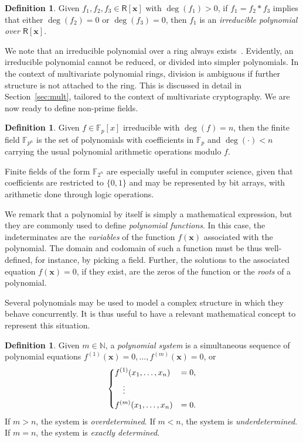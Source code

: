\documentclass[12pt, a4paper, oneside]{memoir}
\theoremstyle{definition}
\newtheorem{definition}[theorem]{Definition}
\begin{document}
\begin{definition}
  Given $f_{1}, f_{2}, f_{3} \in \mathsf{R}[\mathbf{x}]$ with $\deg(f_{1}) > 0$, if $f_{1} = f_{2} \ast f_{3}$ implies that either $\deg(f_{2}) = 0$ or $\deg(f_{3}) = 0$, then $f_{1}$ is an \emph{irreducible polynomial over $\mathsf{R}[\mathbf{x}]$}.
\end{definition}

We note that an irreducible polynomial over a ring always exists~\cite[Remark 2.1.25]{Mullen:2013}. Evidently, an irreducible polynomial cannot be reduced, or divided into simpler polynomials. In the context of multivariate polynomial rings, division is ambiguous if further structure is not attached to the ring. This is discussed in detail in Section~\ref{sec:mult}, tailored to the context of multivariate cryptography. We are now ready to define non-prime fields.

\begin{definition}
  Given $f \in \mathbb{F}_{p}[x]$ irreducible with $\deg(f) = n$, then the finite field $\mathbb{F}_{p^{n}}$ is the set of polynomials with coefficients in $\mathbb{F}_{p}$ and $\deg(\cdot) < n$ carrying the usual polynomial arithmetic operations modulo $f$.
\end{definition}

Finite fields of the form $\mathbb{F}_{2^{n}}$ are especially useful in computer science, given that coefficients are restricted to $\{0, 1\}$ and may be represented by bit arrays, with arithmetic done through logic operations.

We remark that a polynomial by itself is simply a mathematical expression, but they are commonly used to define \emph{polynomial functions}. In this case, the indeterminates are the \emph{variables} of the function $f(\mathbf{x})$ associated with the polynomial. The domain and codomain of such a function must be thus well-defined, for instance, by picking a field. Further, the solutions to the associated equation $f(\mathbf{x}) = 0$, if they exist, are the zeros of the function or the \emph{roots} of a polynomial. 

Several polynomials may be used to model a complex structure in which they behave concurrently. It is thus useful to have a relevant mathematical concept to represent this situation.

\begin{definition}\label{def:polsys}
  Given $m \in \mathbb{N}$, a \emph{polynomial system} is a simultaneous sequence of polynomial equations $f^{(1)}(\mathbf{x}) = 0, \dots, f^{(m)}(\mathbf{x}) = 0$, or
  \begin{align}
    \begin{dcases}
      f^{(1)}(x_{1}, \dots, x_{n}) &= 0, \\
      \quad \vdots \\
      f^{(m)}(x_{1}, \dots, x_{n}) &= 0.
    \end{dcases}
  \end{align}
  If $m > n$, the system is \emph{overdetermined}. If $m < n$, the system is \emph{underdetermined}. If $m = n$, the system is \emph{exactly determined}.
\end{definition}
\end{document}
